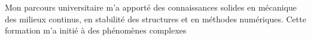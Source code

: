 

Mon parcours universitaire m'a apporté des connaissances solides en mécanique des milieux continus, en stabilité des structures et en méthodes numériques.
Cette formation m'a initié à des phénomènes complexes 




